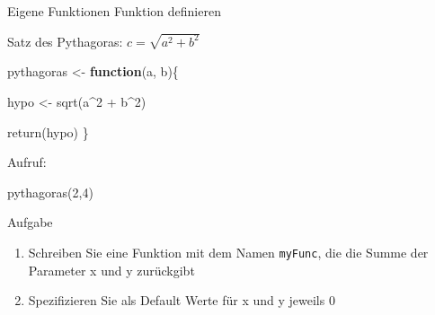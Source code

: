 \documentclass[
  10pt,
  ignorenonframetext,
  aspectratio=169,
]{beamer}
\newenvironment{Shaded}{}{}
\newcommand{\ControlFlowTok}[1]{\textcolor[rgb]{0.00,0.44,0.13}{\textbf{#1}}}
\newcommand{\DecValTok}[1]{\textcolor[rgb]{0.25,0.63,0.44}{#1}}
\newcommand{\FunctionTok}[1]{\textcolor[rgb]{0.02,0.16,0.49}{#1}}
\newcommand{\NormalTok}[1]{#1}
\newcommand{\OtherTok}[1]{\textcolor[rgb]{0.00,0.44,0.13}{#1}}
\newcommand{\SpecialCharTok}[1]{\textcolor[rgb]{0.25,0.44,0.63}{#1}}
\providecommand{\tightlist}{%
  \setlength{\itemsep}{0pt}\setlength{\parskip}{0pt}}
\begin{document}
\begin{frame}[fragile]{Eigene Funktionen}
\label{eigene-funktionen}
Funktion definieren

Satz des Pythagoras: \(c = \sqrt{a^2 + b^2}\)

\begin{Shaded}
\begin{Highlighting}[]
\NormalTok{pythagoras }\OtherTok{\textless{}{-}} \ControlFlowTok{function}\NormalTok{(a, b)\{}

\NormalTok{  hypo }\OtherTok{\textless{}{-}} \FunctionTok{sqrt}\NormalTok{(a}\SpecialCharTok{\^{}}\DecValTok{2} \SpecialCharTok{+}\NormalTok{ b}\SpecialCharTok{\^{}}\DecValTok{2}\NormalTok{)}

  \FunctionTok{return}\NormalTok{(hypo)}
\NormalTok{\}}
\end{Highlighting}
\end{Shaded}

Aufruf:

\begin{Shaded}
\begin{Highlighting}[]
\FunctionTok{pythagoras}\NormalTok{(}\DecValTok{2}\NormalTok{,}\DecValTok{4}\NormalTok{)}
\end{Highlighting}
\end{Shaded}
\end{frame}

\begin{frame}[fragile]{Aufgabe}
\label{aufgabe-2}
\begin{enumerate}
\tightlist
\item
  Schreiben Sie eine Funktion mit dem Namen \texttt{myFunc}, die die
  Summe der Parameter x und y zurückgibt
\item
  Spezifizieren Sie als Default Werte für x und y jeweils 0
\end{enumerate}
\end{frame}
\end{document}
